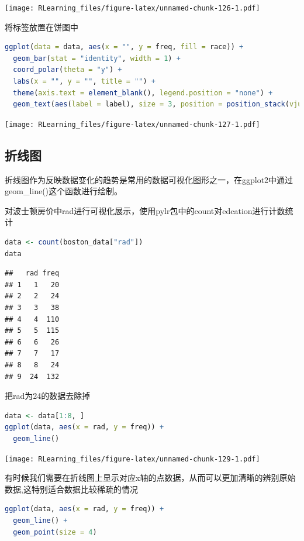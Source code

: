 \documentclass[]{ctexbook}
\begin{document}
\texttt{[image: RLearning\_files/figure-latex/unnamed-chunk-126-1.pdf]}

将标签放置在饼图中

\begin{lstlisting}[language=R]
ggplot(data = data, aes(x = "", y = freq, fill = race)) +
  geom_bar(stat = "identity", width = 1) +
  coord_polar(theta = "y") +
  labs(x = "", y = "", title = "") +
  theme(axis.text = element_blank(), legend.position = "none") +
  geom_text(aes(label = label), size = 3, position = position_stack(vjust = 0.5))
\end{lstlisting}

\texttt{[image: RLearning\_files/figure-latex/unnamed-chunk-127-1.pdf]}

\hypertarget{ux6298ux7ebfux56fe}{%
\subsection{折线图}\label{ux6298ux7ebfux56fe}}

折线图作为反映数据变化的趋势是常用的数据可视化图形之一，在ggplot2中通过geom\_line()这个函数进行绘制。

对波士顿房价中rad进行可视化展示，使用pylr包中的count对edcation进行计数统计

\begin{lstlisting}[language=R]
data <- count(boston_data["rad"])
data
\end{lstlisting}

\begin{lstlisting}
##   rad freq
## 1   1   20
## 2   2   24
## 3   3   38
## 4   4  110
## 5   5  115
## 6   6   26
## 7   7   17
## 8   8   24
## 9  24  132
\end{lstlisting}

把rad为24的数据去除掉

\begin{lstlisting}[language=R]
data <- data[1:8, ]
ggplot(data, aes(x = rad, y = freq)) +
  geom_line()
\end{lstlisting}

\texttt{[image: RLearning\_files/figure-latex/unnamed-chunk-129-1.pdf]}

有时候我们需要在折线图上显示对应x轴的点数据，从而可以更加清晰的辨别原始数据,这特别适合数据比较稀疏的情况

\begin{lstlisting}[language=R]
ggplot(data, aes(x = rad, y = freq)) +
  geom_line() +
  geom_point(size = 4)
\end{lstlisting}
\end{document}

